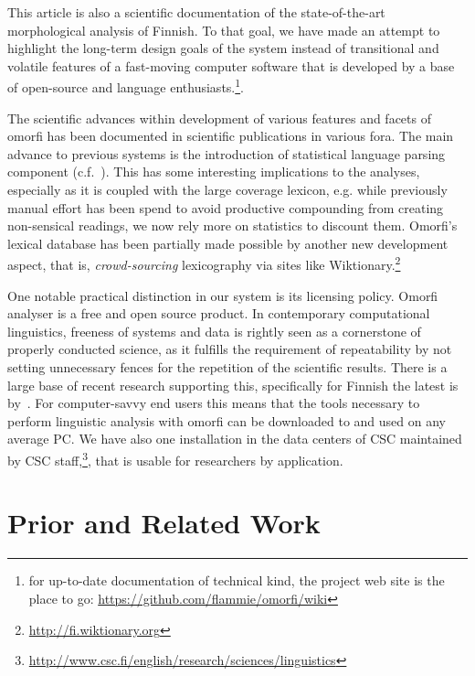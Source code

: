 \documentclass[a4paper,12pt]{article}
\begin{document}
This article is also a scientific documentation of the state-of-the-art
morphological analysis of Finnish. To that goal, we have made an attempt to
highlight the long-term design goals of the system instead of transitional
and volatile features of a fast-moving computer software that is developed
by a base of open-source and language enthusiasts.\footnote{for up-to-date
documentation of technical kind, the project web site is the place to go:
\url{https://github.com/flammie/omorfi/wiki}}.

The scientific advances within development of various features and facets of
omorfi has been documented in scientific publications in various fora. The
main advance to previous systems is the introduction of statistical language
parsing component (c.f.~\citet[for basic introduction]{manning1999foundations}). This has
some interesting implications to the analyses, especially as it is coupled
with the large coverage lexicon, e.g. while previously manual effort has
been spend to avoid productive compounding from creating non-sensical
readings, we now rely more on statistics to discount them. Omorfi's lexical
database has been partially made possible by another new development aspect,
that is, \textit{crowd-sourcing} lexicography via sites like
Wiktionary.\footnote{\url{http://fi.wiktionary.org}}

One notable practical distinction in our system is its licensing policy. Omorfi
analyser is a free and open source product.  In contemporary computational
linguistics, freeness of systems and data is rightly seen as a cornerstone of
properly conducted science, as it fulfills the requirement of repeatability by
not setting unnecessary fences for the repetition of the scientific results.
There is a large base of recent research supporting this, specifically for
Finnish the latest is by~\citet{koskenniemi2008build}. For computer-savvy end
users this means that the tools necessary to perform linguistic analysis with
omorfi can be downloaded to and used on any average PC. We have also one
installation in the data centers of CSC maintained by CSC
staff,\footnote{\url{http://www.csc.fi/english/research/sciences/linguistics}},
that is usable for researchers by application.

\section{Prior and Related Work}
\label{sec:prior-work}
\end{document}
